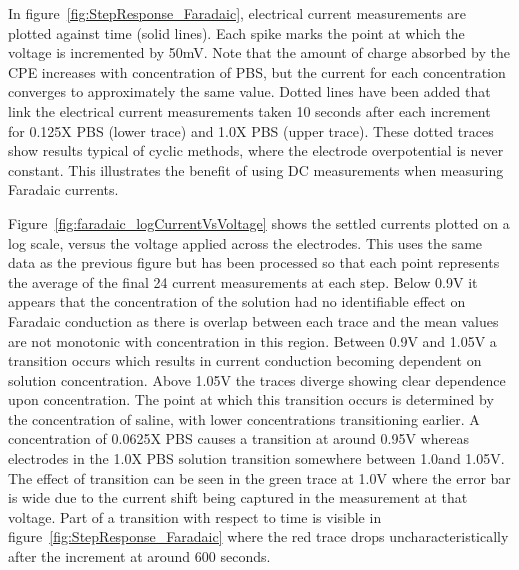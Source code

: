 \documentclass[journal, a4paper]{IEEEtran}
\begin{document}
In figure~\ref{fig:StepResponse_Faradaic}, electrical current measurements are plotted against time (solid lines). Each spike marks the point at which the voltage is incremented by 50\thinspace mV. Note that the amount of charge absorbed by the CPE increases with concentration of PBS, but the current for each concentration converges to approximately the same value. Dotted lines have been added that link the electrical current measurements taken 10 seconds after each increment for 0.125X PBS (lower trace) and 1.0X PBS (upper trace). These dotted traces show results typical of cyclic methods, where the electrode overpotential is never constant. This illustrates the benefit of using DC measurements when measuring Faradaic currents.

Figure~\ref{fig:faradaic_logCurrentVsVoltage} shows the settled currents plotted on a log scale, versus the voltage applied across the electrodes. This uses the same data as the previous figure but has been processed so that each point represents the average of the final 24 current measurements at each step. Below 0.9\thinspace V it appears that the concentration of the solution had no identifiable effect on Faradaic conduction as there is overlap between each trace and the mean values are not monotonic with concentration in this region.  Between 0.9\thinspace V and 1.05\thinspace V a transition occurs which results in current conduction becoming dependent on solution concentration.
Above 1.05\thinspace V the traces diverge showing clear dependence upon concentration.
The point at which this transition occurs is determined by the concentration of saline, with lower concentrations transitioning earlier. A concentration of 0.0625X PBS causes a transition at around 0.95\thinspace V whereas electrodes in the 1.0X PBS solution transition somewhere between 1.0\thinspace and 1.05\thinspace V. The effect of transition can be seen in the green trace at 1.0\thinspace V where the error bar is wide due to the current shift being captured in the measurement at that voltage. Part of a transition with respect to time is visible in figure~\ref{fig:StepResponse_Faradaic} where the red trace drops uncharacteristically after the increment at around 600 seconds.
\end{document}
